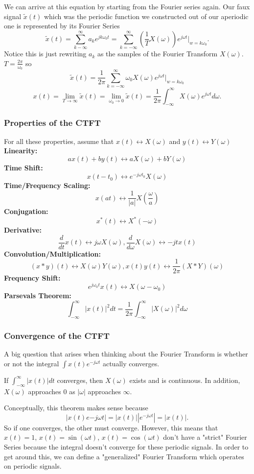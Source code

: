We can arrive at this equation by starting from the Fourier series again.
Our faux signal $\tilde{x}(t)$ which was the periodic function we constructed out of our aperiodic one
is represented by its Fourier Series
\[
  \tilde{x}(t) = \sum_{k-\infty}^{\infty}{a_ke^{jk\omega_0t}} = \sum_{k=-\infty}^{\infty}{\left(\frac{1}{T}X(\omega)\right)e^{j\omega t}}|_{w=k\omega_0}.
\]
Notice this is just rewriting $a_k$ as the samples of the Fourier Transform $X(\omega)$. $T = \frac{2\pi}{\omega_0}$ so
\[
\tilde{x}(t) = \frac{1}{2\pi} \sum_{k=-\infty}^{\infty}{\omega_0X(\omega)e^{j\omega t}}|_{w=k\omega_0}
\]
\[
  x(t) = \lim_{T\to\infty}{\tilde{x}(t)} = \lim_{\omega_0\to0}{\tilde{x}(t)} = \frac{1}{2\pi}\int_{-\infty}^{\infty}{X(\omega)e^{j\omega t}d\omega}.
\]
\subsubsection{Properties of the CTFT}
For all these properties, assume that $x(t) \leftrightarrow X(\omega)$ and $y(t) \leftrightarrow Y(\omega)$\\
\textbf{Linearity: } 
\[
ax(t) + by(t) \leftrightarrow aX(\omega) + bY(\omega)
\]
\textbf{Time Shift: }
\[
x(t-t_0) \leftrightarrow e^{-j\omega t_0}X(\omega)
\]
\textbf{Time/Frequency Scaling: }
\[
x(at) \leftrightarrow \frac{1}{|a|}X(\frac{\omega}{a})
\]
\textbf{Conjugation: } 
\[
x^*(t) \leftrightarrow X^*(-\omega)
\]
\textbf{Derivative: } 
\[
\frac{d}{dt}x(t) \leftrightarrow j\omega X(\omega), \frac{d}{d\omega}X(\omega) \leftrightarrow -jt x(t)
\]
\textbf{Convolution/Multiplication: } 
\[
(x*y)(t) \leftrightarrow X(\omega)Y(\omega), x(t)y(t) \leftrightarrow \frac{1}{2\pi}(X*Y)(\omega)
\]
\textbf{Frequency Shift: } 
\[
e^{j\omega_0 t}x(t) \leftrightarrow X(\omega - \omega_0)
\]
\textbf{Parsevals Theorem: }
\[
\int_{-\infty}^{\infty}{|x(t)|^2dt} = \frac{1}{2\pi}\int_{-\infty}^{\infty}{|X(\omega)|^2d\omega}
\]
\subsubsection{Convergence of the CTFT}
A big question that arises when thinking about the Fourier Transform is whether or not the integral $\int{x(t)e^{-j\omega t}}$
actually converges.
\begin{theorem}
    If $\int_{-\infty}^{\infty}{|x(t)|dt}$ converges, then $X(\omega)$ exists and is continuous.
	In addition, $X(\omega)$ approaches 0 as $|\omega|$ approaches $\infty$.
\end{theorem}
Conceptually, this theorem makes sense because
\[
  |x(t)e{-j\omega t}| = |x(t)| |e^{-j\omega t}| = |x(t)|.
\]
So if one converges, the other must converge. However, this means that $x(t)=1$, $x(t)=\sin(\omega t)$, $x(t)=\cos(\omega t)$
don't have a "strict" Fourier Series because the integral doesn't converge for these periodic signals. In order to get around this,
we can define a "generalized" Fourier Transform which operates on periodic signals.

